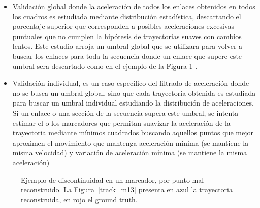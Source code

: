 \begin{itemize}

\item Validación global donde la aceleración de todos los enlaces obtenidos en todos los cuadros es estudiada mediante distribución estadística, descartando  el porcentaje superior que corresponden a posibles aceleraciones excesivas puntuales que no cumplen la hipótesis de trayectorias suaves con cambios lentos. Este estudio arroja un umbral global que se utilizara para volver a buscar los enlaces para toda la secuencia donde un enlace que supere este umbral sera descartado como en el ejemplo de la Figura \ref{discontinuidad_tracking} .

\item Validación individual, es un caso especifico del filtrado de aceleración donde no se busca un umbral global, sino que cada trayectoria obtenida es estudiada para buscar un umbral individual estudiando la distribución de aceleraciones. Si un enlace o una sección de la secuencia supera este umbral, se intenta estimar el o los marcadores que permitan suavizar la aceleración de la trayectoria mediante mínimos cuadrados buscando aquellos puntos que mejor aproximen el movimiento que mantenga aceleración mínima (se mantiene la misma velocidad) y variación de aceleración mínima (se mantiene la misma aceleración)

\end{itemize}

\begin{figure}[ht!]
 \centering
 \caption{Ejemplo de discontinuidad en un marcador, por punto mal reconstruido. La Figura~\ref{track_m13} presenta en azul la trayectoria reconstruida, en rojo el ground truth.}
 \label{discontinuidad_tracking}
\end{figure}

